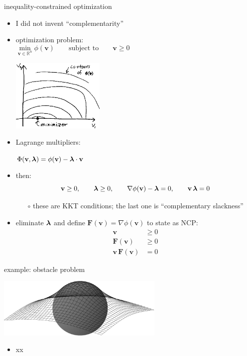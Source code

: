 \documentclass[10pt,hyperref,dvipsnames]{beamer}
\newcommand{\bv}{\mathbf{v}}
\newcommand{\bF}{\mathbf{F}}
\newcommand{\grad}{\nabla}
\newcommand{\RR}{\mathbb{R}}
\begin{document}
\begin{frame}{inequality-constrained optimization}
\begin{itemize}
\item I did not invent ``complementarity''
\item optimization problem:
    $$\min_{\bv\in\RR^n} \phi(\bv) \qquad \text{subject to} \qquad \bv \ge 0 \phantom{sd ad adsaf jsdlkja asdf kj asdf asdfa ad sdfa sad}$$

\vspace{-20mm}
\hfill \includegraphics[width=0.35\textwidth]{figs/optimization.png}

\vspace{-8mm}
\item Lagrange multipliers:

\smallskip
\qquad $\Phi(\bv,\blambda) = \phi(\bv) - \blambda \cdot \bv$
\item then:
    $$\bv \ge 0, \qquad \blambda \ge 0, \qquad \grad \phi(\bv) - \blambda = 0, \qquad \bv\, \blambda = 0$$

    \begin{itemize}
    \item[$\circ$] these are KKT conditions; the last one is ``complementary slackness''
    \end{itemize}
\item eliminate $\bm{\lambda}$ and define $\bF(\bv) = \grad \phi(\bv)$ to state as NCP:
\begin{align*}
\bv &\ge 0 \\
\bF(\bv) &\ge 0 \\
\bv\, \bF(\bv) &= 0
\end{align*}
\end{itemize}
\end{frame}

\begin{frame}{example: obstacle problem}

\begin{center}
\includegraphics[width=0.6\textwidth]{figs/obstacle65.pdf}
\end{center}

\begin{itemize}
\item xx
\end{itemize}
\end{frame}
\end{document}
